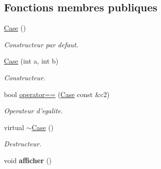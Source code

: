 \subsection*{\-Fonctions membres publiques}
\begin{DoxyCompactItemize}
\item 
\hypertarget{classCase_a14237e17aab1829965adab76b747db6c}{\hyperlink{classCase_a14237e17aab1829965adab76b747db6c}{\-Case} ()}\label{classCase_a14237e17aab1829965adab76b747db6c}

\begin{DoxyCompactList}\small\item\em \-Constructeur par defaut. \end{DoxyCompactList}\item 
\hypertarget{classCase_ad61be010b8d3cc841706c989c08aaaac}{\hyperlink{classCase_ad61be010b8d3cc841706c989c08aaaac}{\-Case} (int a, int b)}\label{classCase_ad61be010b8d3cc841706c989c08aaaac}

\begin{DoxyCompactList}\small\item\em \-Constructeur. \end{DoxyCompactList}\item 
bool \hyperlink{classCase_aba81e8660bf4009cc0ddee8e132bce49}{operator==} (\hyperlink{classCase}{\-Case} const \&c2)
\begin{DoxyCompactList}\small\item\em \-Operateur d'egalite. \end{DoxyCompactList}\item 
\hypertarget{classCase_ab004564aae3e15db0c7fd5dde0b4c379}{virtual \hyperlink{classCase_ab004564aae3e15db0c7fd5dde0b4c379}{$\sim$\-Case} ()}\label{classCase_ab004564aae3e15db0c7fd5dde0b4c379}

\begin{DoxyCompactList}\small\item\em \-Destructeur. \end{DoxyCompactList}\item 
\hypertarget{classCase_ad3faa1f96e315587b4fb70de225a8b80}{void {\bfseries afficher} ()}\label{classCase_ad3faa1f96e315587b4fb70de225a8b80}


\end{DoxyCompactItemize}
